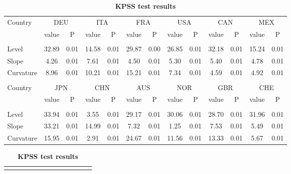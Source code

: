 \documentclass[12pt,bibliography=totoc]{article}
\begin{document}
\begin{appendices}
\begin{table}
\begin{subtable}[t]{1\textwidth}
\begin{tabular}{l cc cc cc cc cc cc}
Country	&	\multicolumn{2}{c}{DEU}			&	\multicolumn{2}{c}{ITA}			&	\multicolumn{2}{c}{FRA}			&	\multicolumn{2}{c}{USA}			&	\multicolumn{2}{c}{CAN}			&	\multicolumn{2}{c}{MEX}			\\[0.5ex] 

 & value &P & value &P& value &P & value &P& value &P & value &P\\

\hline       \\ [-1.5ex] 

Level	&	32.89	&	0.01	&	14.58	&	0.01	&	29.87	&	0.00	&	26.85	&	0.01	&	32.18	&	0.01	&	15.24	&	0.01	\\
Slope	&	4.26	&	0.01	&	7.61	&	0.01	&	4.50	&	0.01	&	5.30	&	0.01	&	5.40	&	0.01	&	4.78	&	0.01	\\
\medskip
Curvature	&	8.96	&	0.01	&	10.21	&	0.01	&	15.21	&	0.01	&	7.34	&	0.01	&	4.59	&	0.01	&	4.92	&	0.01	\\


\hline   \\ [-1.5ex]    

Country	&	\multicolumn{2}{c}{JPN}			&	\multicolumn{2}{c}{CHN}			&	\multicolumn{2}{c}{AUS}			&	\multicolumn{2}{c}{NOR}			&	\multicolumn{2}{c}{GBR}			&	\multicolumn{2}{c}{CHE}			\\

 & value &P & value &P& value &P & value &P& value &P & value &P\\

\hline       \\ [-1.5ex] 

Level	&	33.94	&	0.01	&	3.55	&	0.01	&	29.17	&	0.01	&	30.06	&	0.01	&	28.70	&	0.01	&	31.96	&	0.01	\\
Slope	&	33.21	&	0.01	&	14.99	&	0.01	&	7.32	&	0.01	&	1.25	&	0.01	&	7.53	&	0.01	&	5.49	&	0.01	\\
\medskip
Curvature	&	15.95	&	0.01	&	2.91	&	0.01	&	24.67	&	0.01	&	11.56	&	0.01	&	13.33	&	0.01	&	5.67	&	0.01	\\


\hline
\end{tabular}
\caption{\textbf{KPSS test results}}

\end{subtable}
\hspace{\fill}
\bigskip

\begin{subtable}[t]{1\textwidth}
\centering
\begin{tabular}{l cc cc cc cc cc cc}%
\hline\hline \\ [-1.5ex]                         %


\end{tabular}
\end{subtable}
\end{table}
\end{appendices}
\end{document}
